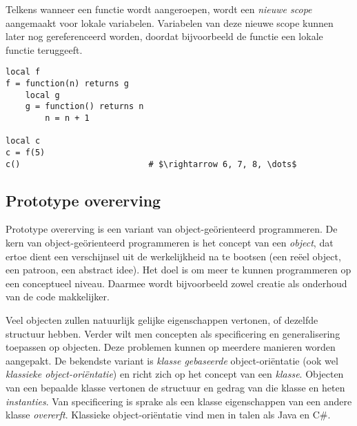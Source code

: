 
Telkens wanneer een functie wordt aangeroepen, wordt een \emph{nieuwe scope} aangemaakt voor lokale variabelen. Variabelen van deze nieuwe scope kunnen later nog gereferenceerd worden, doordat bijvoorbeeld de functie een lokale functie teruggeeft.

\newCodeFragment


\begin{lstlisting}[caption=Een countervoorbeeld,label=exa:counter]
local f
f = function(n) returns g
    local g
    g = function() returns n
        n = n + 1

local c
c = f(5)
c()                          # $\rightarrow 6, 7, 8, \dots$
\end{lstlisting}


\subsection{Prototype overerving}

Prototype overerving is een variant van object-geörienteerd programmeren. De kern van object-geörienteerd programmeren is het concept van een \emph{object}, dat ertoe dient een verschijnsel uit de werkelijkheid na te bootsen (een reëel object, een patroon, een abstract idee). Het doel is om meer te kunnen programmeren op een conceptueel niveau. Daarmee wordt bijvoorbeeld zowel creatie als onderhoud van de code makkelijker.

Veel objecten zullen natuurlijk gelijke eigenschappen vertonen, of dezelfde structuur hebben. Verder wilt men concepten als specificering en generalisering toepassen op objecten. Deze problemen kunnen op meerdere manieren worden aangepakt. De bekendste variant is \emph{klasse gebaseerde} object-oriëntatie (ook wel \emph{klassieke object-oriëntatie}) en richt zich op het concept van een \emph{klasse}. Objecten van een bepaalde klasse vertonen de structuur en gedrag van die klasse en heten \emph{instanties}. Van specificering is sprake als een klasse eigenschappen van een andere klasse \emph{overerft}. Klassieke object-oriëntatie vind men in talen als Java en C\#.

